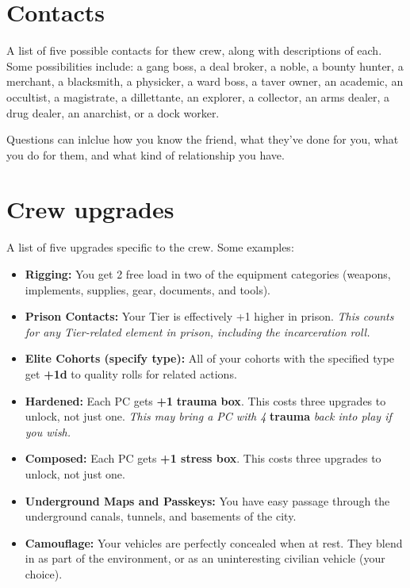 \documentclass[11pt,fleqn,a5paper]{book}
\newcommand{\gameterm}[1]{\textbf{#1}}
\begin{document}
\section{Contacts}

A list of five possible contacts for thew crew, along with descriptions of each. Some possibilities include: a gang boss, a deal broker, a noble, a bounty hunter, a merchant, a blacksmith, a physicker, a ward boss, a taver owner, an academic, an occultist, a magistrate, a dillettante, an explorer, a collector, an arms dealer, a drug dealer, an anarchist, or a dock worker.

Questions can inlclue how you know the friend, what they’ve done for you,  what you do for them, and what kind of relationship you have.

\section{Crew upgrades}

A list of five upgrades specific to the crew. Some examples:

\begin{itemize}
	\item \textbf{Rigging:} You get 2 free load in two of the equipment categories (weapons, implements, supplies, gear, documents, and tools).
	\item \textbf{Prison Contacts:} Your Tier is effectively +1 higher in prison. \emph{This counts for any Tier-related element in prison, including the incarceration roll.}
	\item \textbf{Elite Cohorts (specify type):} All of your cohorts with the specified type get \textbf{+1d} to quality rolls for related actions.
	\item \textbf{Hardened:} Each PC gets \textbf{+1 }\gameterm{trauma} \textbf{ box}. This costs three upgrades to unlock, not just one. \emph{This may bring a PC with 4 }\gameterm{trauma} \emph{ back into play if you wish.}
	\item \textbf{Composed:} Each PC gets \textbf{+1 stress box}. This costs three upgrades to unlock, not just one.
	\item \textbf{Underground Maps and Passkeys:} You have easy passage through the underground canals, tunnels, and basements of the city.
	\item \textbf{Camouflage:} Your vehicles are perfectly concealed when at rest. They blend in as part of the environment, or as an uninteresting civilian vehicle (your choice).
\end{itemize}
\end{document}
